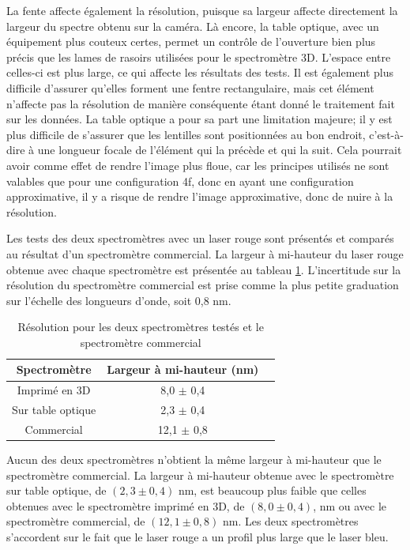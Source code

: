 \documentclass[11pt,letterpaper]{article}
\begin{document}
La fente affecte également la résolution, puisque sa largeur affecte directement la largeur du spectre
obtenu sur la caméra. Là encore, la table optique, avec un équipement plus couteux certes, permet un
contrôle de l'ouverture bien plus précis que les lames de rasoirs utilisées pour le spectromètre 3D.
L'espace entre celles-ci est plus large, ce qui affecte les résultats des tests. Il est également 
plus difficile d'assurer qu'elles forment une fentre rectangulaire, mais cet élément n'affecte pas 
la résolution de manière conséquente étant donné le traitement fait sur les données.
La table optique a pour sa part une limitation majeure; il y est plus difficile de s'assurer que les
lentilles sont positionnées au bon endroit, c'est-à-dire à une longueur focale de l'élément qui la 
précède et qui la suit. Cela pourrait avoir comme effet de rendre l'image plus floue, car les principes
utilisés ne sont valables que pour une configuration 4f, donc en ayant une configuration approximative,
il y a risque de rendre l'image approximative, donc de nuire à la résolution. 

Les tests des deux spectromètres avec un laser rouge sont présentés et comparés au résultat d'un 
spectromètre commercial. La largeur à mi-hauteur du laser rouge obtenue avec chaque spectromètre est 
présentée au tableau \ref{res_tab_rouge}. L'incertitude sur la résolution du spectromètre commercial 
est prise comme la plus petite graduation sur l'échelle des longueurs d'onde, soit 0,8 nm.

\begin{table}[H]
  \centering
  \begin{tabular}{|c|c|c|}\hline
    Spectromètre & Largeur à mi-hauteur (nm) \\
    \hline
    Imprimé en 3D & 8,0 $\pm$ 0,4\\    \hline
    Sur table optique & 2,3 $\pm$ 0,4\\    \hline
    Commercial & 12,1 $\pm$ 0,8\\    \hline
  \end{tabular}
  \caption{Résolution pour les deux spectromètres testés et le spectromètre commercial}
  \label{res_tab_rouge}
\end{table}

Aucun des deux spectromètres n'obtient la même largeur à mi-hauteur que le spectromètre commercial.
La largeur à mi-hauteur obtenue avec le spectromètre sur table optique, de $(2,3 \pm 0,4)$ nm, est 
beaucoup plus faible que celles obtenues avec le spectromètre imprimé en 3D, de $(8,0 \pm 0,4)$, nm 
ou avec le spectromètre commercial, de $(12,1 \pm 0,8)$ nm. Les deux spectromètres s'accordent sur 
le fait que le laser rouge a un profil plus large que le laser bleu.
\end{document}
